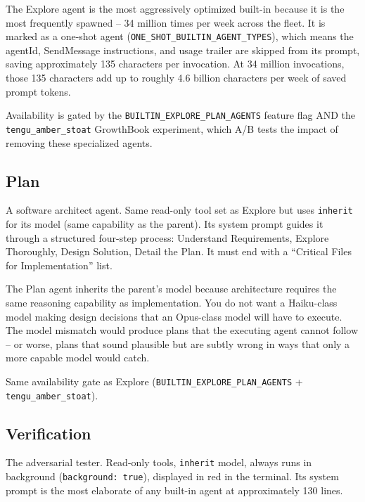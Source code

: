 \documentclass[
  english,
  11pt,
  letterpaper,
]{book}
\begin{document}
The Explore agent is the most aggressively optimized built-in because it
is the most frequently spawned -- 34 million times per week across the
fleet. It is marked as a one-shot agent
(\texttt{ONE\_SHOT\_BUILTIN\_AGENT\_TYPES}), which means the agentId,
SendMessage instructions, and usage trailer are skipped from its prompt,
saving approximately 135 characters per invocation. At 34 million
invocations, those 135 characters add up to roughly 4.6 billion
characters per week of saved prompt tokens.

Availability is gated by the \texttt{BUILTIN\_EXPLORE\_PLAN\_AGENTS}
feature flag AND the \texttt{tengu\_amber\_stoat} GrowthBook experiment,
which A/B tests the impact of removing these specialized agents.

\subsection{Plan}\label{plan}

A software architect agent. Same read-only tool set as Explore but uses
\texttt{\textquotesingle{}inherit\textquotesingle{}} for its model (same
capability as the parent). Its system prompt guides it through a
structured four-step process: Understand Requirements, Explore
Thoroughly, Design Solution, Detail the Plan. It must end with a
``Critical Files for Implementation'' list.

The Plan agent inherits the parent's model because architecture requires
the same reasoning capability as implementation. You do not want a
Haiku-class model making design decisions that an Opus-class model will
have to execute. The model mismatch would produce plans that the
executing agent cannot follow -- or worse, plans that sound plausible
but are subtly wrong in ways that only a more capable model would catch.

Same availability gate as Explore
(\texttt{BUILTIN\_EXPLORE\_PLAN\_AGENTS} +
\texttt{tengu\_amber\_stoat}).

\subsection{Verification}\label{verification}

The adversarial tester. Read-only tools,
\texttt{\textquotesingle{}inherit\textquotesingle{}} model, always runs
in background (\texttt{background:\ true}), displayed in red in the
terminal. Its system prompt is the most elaborate of any built-in agent
at approximately 130 lines.
\end{document}
